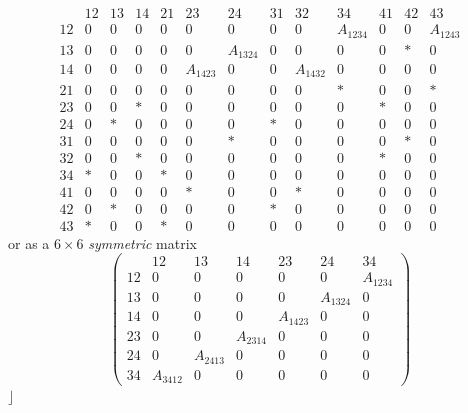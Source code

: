 \documentclass[aps, preprint]{revtex4}
\begin{document}
\begin{equation*}\begin{array}{ccccccccccccc}\, & 12 & 13 & 14 & 21 & 23 & 24 & 31 & 32 & 34 & 41 & 42 & 43 \\
12 & 0 & 0 & 0 & 0 & 0 & 0 & 0 & 0 & A_{1 2 3 4} & 0 & 0 & A_{1 2 4 3} \\
13 & 0 & 0 & 0 & 0 & 0 & A_{1 3 2 4} & 0 & 0 & 0 & 0 &  \ast  & 0 \\
14 & 0 & 0 & 0 & 0 & A_{1 4 2 3} & 0 & 0 & A_{1 4 3 2} & 0 & 0 & 0 & 0 \\
21 & 0 & 0 & 0 & 0 & 0 & 0 & 0 & 0 &  \ast  & 0 & 0 &  \ast  \\
23 & 0 & 0 &  \ast  & 0 & 0 & 0 & 0 & 0 & 0 &  \ast  & 0 & 0 \\
24 & 0 &  \ast  & 0 & 0 & 0 & 0 &  \ast  & 0 & 0 & 0 & 0 & 0 \\
31 & 0 & 0 & 0 & 0 & 0 &  \ast  & 0 & 0 & 0 & 0 &  \ast  & 0 \\
32 & 0 & 0 &  \ast  & 0 & 0 & 0 & 0 & 0 & 0 &  \ast  & 0 & 0 \\
34 &  \ast  & 0 & 0 &  \ast  & 0 & 0 & 0 & 0 & 0 & 0 & 0 & 0 \\
41 & 0 & 0 & 0 & 0 &  \ast  & 0 & 0 &  \ast  & 0 & 0 & 0 & 0 \\
42 & 0 &  \ast  & 0 & 0 & 0 & 0 &  \ast  & 0 & 0 & 0 & 0 & 0 \\
43 &  \ast  & 0 & 0 &  \ast  & 0 & 0 & 0 & 0 & 0 & 0 & 0 & 0\end{array}
\end{equation*}or as a $6 \times 6$ \emph{symmetric} matrix
\begin{equation*}\left (\begin{array}{ccccccc}\, & 12 & 13 & 14 & 23 & 24 & 34 \\
12 & 0 & 0 & 0 & 0 & 0 & A_{1 2 3 4} \\
13 & 0 & 0 & 0 & 0 & A_{1 3 2 4} & 0 \\
14 & 0 & 0 & 0 & A_{1 4 2 3} & 0 & 0 \\
23 & 0 & 0 & A_{2 3 1 4} & 0 & 0 & 0 \\
24 & 0 & A_{2 4 1 3} & 0 & 0 & 0 & 0 \\
34 & A_{3 4 1 2} & 0 & 0 & 0 & 0 & 0\end{array}\right )
\end{equation*}$\rfloor $ 
\end{document}
